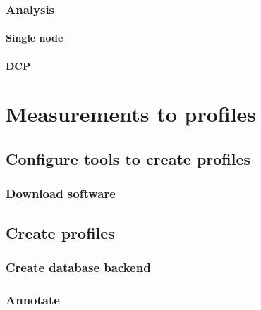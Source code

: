\documentclass[]{book}
\begin{document}
\hypertarget{analysis-1}{%
\section{Analysis}\label{analysis-1}}

\hypertarget{single-node-1}{%
\subsection{Single node}\label{single-node-1}}

\hypertarget{dcp-1}{%
\subsection{DCP}\label{dcp-1}}

\hypertarget{part-measurements-to-profiles}{%
\part{Measurements to
profiles}\label{part-measurements-to-profiles}}

\hypertarget{configure-tools-to-create-profiles}{%
\chapter{Configure tools to create
profiles}\label{configure-tools-to-create-profiles}}

\hypertarget{download-software-1}{%
\section{Download software}\label{download-software-1}}

\hypertarget{create-profiles}{%
\chapter{Create profiles}\label{create-profiles}}

\hypertarget{create-database-backend}{%
\section{Create database backend}\label{create-database-backend}}

\hypertarget{annotate}{%
\section{Annotate}\label{annotate}}
\end{document}
